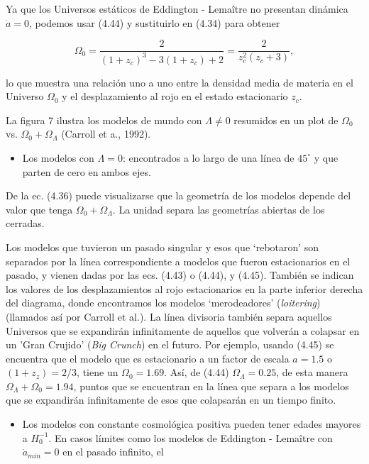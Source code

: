 \documentclass[11pt]{article}
\begin{document}
{    
    Ya que los Universos estáticos de Eddington - Lema\^itre no presentan dinámica $\dot{a}=0$, podemos usar (4.44) y sustituirlo en (4.34) para obtener
    
    \begin{equation}
        \Omega_0 = \frac{2}{ (1 + z_c)^3 - 3  (1 + z_c) + 2} = \frac{2}{ z_c^2(z_c + 3)},
    \end{equation}
    
    lo que muestra una relación uno a uno entre la densidad media de materia en el Universo $\Omega_0$ y el desplazamiento al rojo en el estado estacionario $z_c$.
    
    La figura 7 ilustra los modelos de mundo con $\Lambda \neq 0$  resumidos en un plot de $\Omega_0$  vs. $\Omega_0 + \Omega_{\Lambda}$ (Carroll et a., 1992). 
    
    \begin{itemize}
        \item Los modelos con $\Lambda=0$: encontrados a lo largo de una línea de $45^{\circ}$ y que parten de cero en ambos ejes. 
    \end{itemize}
    
    De la ec. (4.36) puede visualizarse que la geometría de los modelos depende del valor que tenga $\Omega_0 +  \Omega_{\Lambda}$. La unidad separa las geometrías abiertas de los cerradas. 
    
    Los modelos que tuvieron un pasado singular y esos que `rebotaron' son separados por la línea correspondiente a modelos que fueron estacionarios en el pasado, y vienen dadas por las ecs. (4.43) o (4.44), y (4.45). También se indican los valores de los desplazamientos al rojo estacionarios en la parte inferior derecha del diagrama, donde encontramos los modelos `merodeadores' ({\textit{loitering}}) (llamados así por Carroll et al.). La línea divisoria también separa aquellos Universos que se expandirán infinitamente de aquellos que volverán a colapsar en un 'Gran Crujido' ({\textit{Big Crunch}}) en el futuro. Por ejemplo, usando (4.45) se encuentra que el modelo que es estacionario a un factor de escala $a=1.5$ o $(1+z_z)=2/3$, tiene un $\Omega_0=1.69$. Así, de (4.44) $\Omega_{\Lambda} =0.25$, de esta manera $\Omega_{\Lambda} + \Omega_0 = 1.94$, puntos que se encuentran en la línea que separa a los modelos que se expandirán infinitamente de esos que colapsarán en un tiempo finito. 
    
    
    \begin{itemize}
        \item Los modelos con constante cosmológica positiva pueden tener edades mayores a $H_0^{-1}$. En casos límites como los modelos de Eddington - Lema\^itre con $\dot{a}_{min}=0$ en el pasado infinito, el 
        

\end{itemize}}
\end{document}

